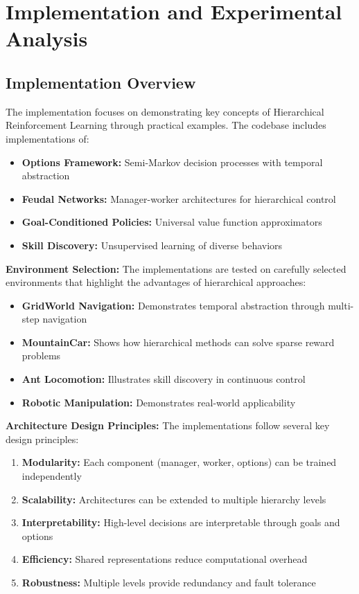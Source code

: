 \documentclass[12pt]{article}
\begin{document}
{{\section{Implementation and Experimental Analysis}

\subsection{Implementation Overview}

The implementation focuses on demonstrating key concepts of Hierarchical Reinforcement Learning through practical examples. The codebase includes implementations of:

\begin{itemize}
    \item \textbf{Options Framework:} Semi-Markov decision processes with temporal abstraction
    \item \textbf{Feudal Networks:} Manager-worker architectures for hierarchical control
    \item \textbf{Goal-Conditioned Policies:} Universal value function approximators
    \item \textbf{Skill Discovery:} Unsupervised learning of diverse behaviors
\end{itemize}

\textbf{Environment Selection:}
The implementations are tested on carefully selected environments that highlight the advantages of hierarchical approaches:

\begin{itemize}
    \item \textbf{GridWorld Navigation:} Demonstrates temporal abstraction through multi-step navigation
    \item \textbf{MountainCar:} Shows how hierarchical methods can solve sparse reward problems
    \item \textbf{Ant Locomotion:} Illustrates skill discovery in continuous control
    \item \textbf{Robotic Manipulation:} Demonstrates real-world applicability
\end{itemize}

\textbf{Architecture Design Principles:}
The implementations follow several key design principles:

\begin{enumerate}
    \item \textbf{Modularity:} Each component (manager, worker, options) can be trained independently
    \item \textbf{Scalability:} Architectures can be extended to multiple hierarchy levels
    \item \textbf{Interpretability:} High-level decisions are interpretable through goals and options
    \item \textbf{Efficiency:} Shared representations reduce computational overhead
    \item \textbf{Robustness:} Multiple levels provide redundancy and fault tolerance
\end{enumerate}

}}
\end{document}
